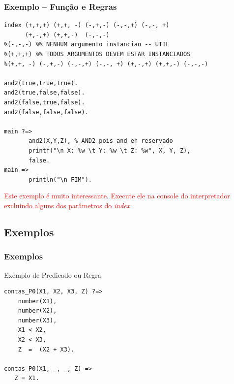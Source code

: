 \begin{frame} [fragile]
\frametitle{Exemplo -- Função e Regras}

\begin{footnotesize}
\begin{verbatim}
index (+,+,+) (+,+, -) (-,+,-) (-,-,+) (-,-, +) 
      (+,-,+) (+,+,-)  (-,-,-)
%(-,-,-) %% NENHUM argumento instanciao -- UTIL
%(+,+,+) %% TODOS ARGUMENTOS DEVEM ESTAR INSTANCIADOS
%(+,+, -) (-,+,-) (-,-,+) (-,-, +) (+,-,+) (+,+,-) (-,-,-)

and2(true,true,true).
and2(true,false,false).
and2(false,true,false).
and2(false,false,false).

main ?=>
       and2(X,Y,Z), % AND2 pois and eh reservado
       printf("\n X: %w \t Y: %w \t Z: %w", X, Y, Z),
       false.
main =>       
       println("\n FIM"). 
\end{verbatim}
\end{footnotesize}

\textcolor{red}{Este exemplo é muito interessante. Execute ele na console do interpretador
excluindo alguns dos parâmetros do \textit{index}}

\end{frame}





\subsection{Exemplos}

\begin{frame}[fragile]

\frametitle{Exemplos}

\begin{block}{Exemplo de Predicado ou Regra}
   
\begin{lstlisting}[frame=single]
contas_P0(X1, X2, X3, Z) ?=>
    number(X1),
    number(X2),
    number(X3),
    X1 < X2,
    X2 < X3,
    Z  =  (X2 + X3).
    
contas_P0(X1, _, _, Z) =>
   Z = X1.    
\end{lstlisting}
\end{block}

        
\end{frame}


